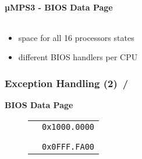 \documentclass{beamer}
\begin{document}
\begin{frame}
\begin{center}
\begin{minipage}{0.47\textwidth}
\begin{block}{\textbf{{\small µMPS3 - BIOS Data Page}}}
\begin{figure}[h]
\begin{tabular}{rcl}
					\end{tabular}
				\end{figure}
				\begin{scriptsize}
					\begin{itemize}
						\item space for all 16 processors states
						\item different BIOS handlers per CPU
					\end{itemize}
				\end{scriptsize}
			\end{block}
		\end{minipage}
	\end{center}
\end{frame}

\begin{frame}
	\frametitle{Exception Handling (2) \hspace{0pt plus 1 filll} \insertframenumber\,/\,\inserttotalframenumber}
	\begin{center}
		\begin{minipage}{0.49\textwidth}
			\begin{block}{\textbf{BIOS Data Page}}
				\begin{figure}[h]
					\renewcommand{\arraystretch}{0.91}
					\begin{tabular}{cl}
						\multicolumn{1}{l}{}                                                                                          & \multirow{2}{*}{\texttt{{\tiny 0x1000.0000}}} \\ \hhline{-~}
						\multicolumn{1}{|l|}{\multirow{4}{*}{\cellcolor{nord0}}}                                                      &                                               \\
						\multicolumn{1}{|l|}{\cellcolor{nord0}}                                                                       &                                               \\
						\multicolumn{1}{|l|}{\cellcolor{nord0}}                                                                       &                                               \\
						\multicolumn{1}{|l|}{\cellcolor{nord0}}                                                                       & \multirow{2}{*}{\texttt{{\tiny 0x0FFF.FA00}}} \\ \hhline{-~}
						\multicolumn{1}{|c|}{\cellcolor{nord10}}                                                                      &                                               \\

\end{tabular}
\end{figure}
\end{block}
\end{minipage}
\end{center}
\end{frame}
\end{document}
